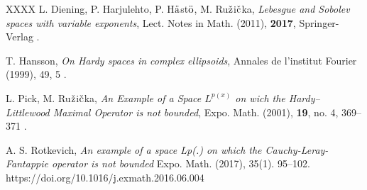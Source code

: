 \documentclass[review]{elsarticle}
\begin{document}
\begin{thebibliography}{XXXX}
 L. Diening, P. Harjulehto, P. H$\rm{\ddot{a}}$st$\rm{\ddot{o}}$, M. Ru$\rm{\check{z}}$i$\rm{\check{c}}$ka, {\it Lebesgue and Sobolev spaces with variable exponents}, Lect. Notes in Math. (2011), {\bf 2017},
Springer-Verlag .

 T. Hansson, {\it On Hardy spaces in complex ellipsoids}, Annales de l'institut Fourier (1999),  49, 5 .

 L. Pick, M. Ru$\rm{\check{z}}$i$\rm{\check{c}}$ka, {\it An Example of a Space $L^{p(x)}$ on wich the Hardy--Littlewood Maximal Operator is not bounded}, Expo. Math. (2001), {\bf 19}, no. 4, 369--371 .


 A. S. Rotkevich, {\it  An example of a space Lp(.) on which the Cauchy-Leray-Fantappie operator is not bounded} Expo. Math. (2017), 35(1). 95–102. https://doi.org/10.1016/j.exmath.2016.06.004


\end{thebibliography}
\end{document}
